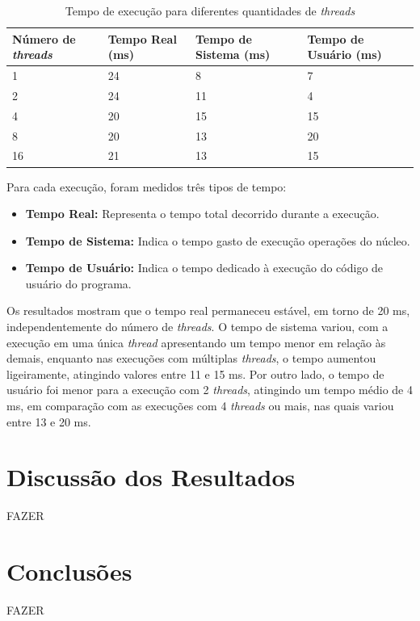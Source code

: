 \documentclass[
	12pt,				%
	oneside,   	        %
	a4paper,			%
	english,			%
	french,				%
	spanish,			%
	brazil,				%
	]{pacotes/abntex2}
\begin{document}
\begin{table}[!htb]
\centering
\caption{Tempo de execução para diferentes quantidades de \textit{threads}}
\label{table:time}
\footnotesize
\begin{tabular}{@{}l|lll@{}}
\toprule
\textbf{Número de \textit{threads}} & \textbf{Tempo Real (ms)} & \textbf{Tempo de Sistema (ms)} & \textbf{Tempo de Usuário (ms)}\\ 
\midrule
1 & 24 & 8 & 7 \\
2 & 24 & 11 & 4 \\
4 & 20 & 15 & 15 \\
8 & 20 & 13 & 20 \\
16 & 21 & 13 & 15 \\
\bottomrule
\end{tabular}
\end{table}

Para cada execução, foram medidos três tipos de tempo:

\begin{itemize}
    \item \textbf{Tempo Real:} Representa o tempo total decorrido durante a execução.
    \item \textbf{Tempo de Sistema:} Indica o tempo gasto de execução operações do núcleo.
    \item \textbf{Tempo de Usuário:} Indica o tempo dedicado à execução do código de usuário do programa.
\end{itemize}

Os resultados mostram que o tempo real permaneceu estável, em torno de 20 ms, independentemente do número de \textit{threads}. O tempo de sistema variou, com a execução em uma única \textit{thread} apresentando um tempo menor em relação às demais, enquanto nas execuções com múltiplas \textit{threads}, o tempo aumentou ligeiramente, atingindo valores entre 11 e 15 ms. Por outro lado, o tempo de usuário foi menor para a execução com 2 \textit{threads}, atingindo um tempo médio de 4 ms, em comparação com as execuções com 4 \textit{threads} ou mais, nas quais variou entre 13 e 20 ms.

\section{Discussão dos Resultados}
\label{sec:discussao}
FAZER

\section{Conclusões}
\label{sec:conclusoes}
FAZER

\postextual
\renewcommand{\bibsection}{%
\section{\bibname}
\bibmark
\prebibhook}


\end{document}
